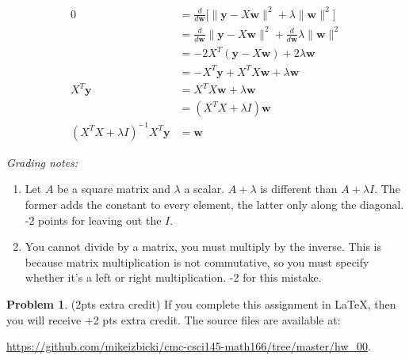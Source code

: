 \documentclass[10pt]{article}
\theoremstyle{definition}
\newtheorem{problem}{Problem}
\newcommand{\trans}[1]{{#1}^{T}}
\newcommand{\w}{\mathbf w}
\newcommand{\y}{\mathbf y}
\newcommand{\ltwo}[1]{\lVert {#1} \rVert}
\begin{document}
\begin{align}
    0
    &= \frac{d}{d\w} \bigg[ \ltwo{\y-X\w}^2 + \lambda\ltwo{\w}^2 \bigg] \\
    &= \frac{d}{d\w} \ltwo{\y-X\w}^2 + \frac{d}{d\w}\lambda\ltwo{\w}^2 \\
    &= -2\trans X(\y-X\w) + 2\lambda\w \\
    &= -\trans X\y+\trans X X\w + \lambda\w \\
    \trans X\y &= \trans X X\w + \lambda\w \\
    &= (\trans X X + \lambda I) \w \\
    (\trans X X + \lambda I)^{-1}\trans X\y &= \w
\end{align}

\noindent
\textit{Grading notes:}
\begin{enumerate}
    \item 
        Let $A$ be a square matrix and $\lambda$ a scalar.  
        $A+\lambda$ is different than $A+\lambda I$.
        The former adds the constant to every element, the latter only along the diagonal.
        -2 points for leaving out the $I$.

    \item
        You cannot divide by a matrix, you must multiply by the inverse.
        This is because matrix multiplication is not commutative, so you must specify whether it's a left or right multiplication.
        -2 for this mistake.
\end{enumerate}

\begin{problem}
    (2pts extra credit)
    If you complete this assignment in \LaTeX, then you will receive +2 pts extra credit.
    The source files are available at: 
    
    \url{https://github.com/mikeizbicki/cmc-csci145-math166/tree/master/hw_00}.
\end{problem}
\end{document}
